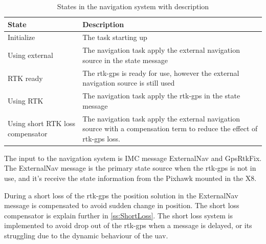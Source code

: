 \begin{table}[H]
\begin{tabular}{ | p{3cm} | p{8cm} |}
	\hline 
	\textbf{State}						& \textbf{Description} \\ \hline
	Initialize							& The task starting up\\ \hline
	Using external						& The navigation task apply the external navigation source in the state message\\ \hline
	RTK ready							& The \gls{rtk-gps} is ready for use, however the external navigation source is still used\\ \hline
	Using RTK							& The navigation task apply the \gls{rtk-gps} in the state message\\ \hline
	Using short RTK loss compensator	& The navigation task apply the external navigation source with a compensation term to reduce the effect of \gls{rtk-gps} loss. \\ \hline
\end{tabular}
\caption{States in the navigation system with description}
\label{Tb:StateDescription}
\end{table}

The input to the navigation system is IMC message ExternalNav and GpsRtkFix. The ExternalNav message is the primary state source when the \gls{rtk-gps} is not in use, and it's receive the state information from the Pixhawk mounted in the X8.

During a short loss of the \gls{rtk-gps} the position solution in the ExternalNav message is compensated to avoid sudden change in position. The short loss compensator is explain further in \ref{ss:ShortLoss}. The short loss system is implemented to avoid drop out of the \gls{rtk-gps} when a message is delayed, or its struggling due to the dynamic behaviour of the \gls{uav}.

